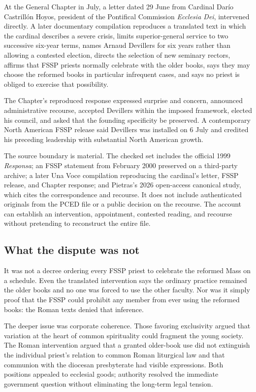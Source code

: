 At the General Chapter in July, a letter dated 29 June from Cardinal Darío Castrillón Hoyos, president of the Pontifical Commission \emph{Ecclesia Dei}, intervened directly. A later documentary compilation reproduces a translated text in which the cardinal describes a severe crisis, limits superior-general service to two successive six-year terms, names Arnaud Devillers for six years rather than allowing a contested election, directs the selection of new seminary rectors, affirms that FSSP priests normally celebrate with the older books, says they may choose the reformed books in particular infrequent cases, and says no priest is obliged to exercise that possibility.

The Chapter's reproduced response expressed surprise and concern, announced administrative recourse, accepted Devillers within the imposed framework, elected his council, and asked that the founding specificity be preserved. A contemporary North American FSSP release said Devillers was installed on 6 July and credited his preceding leadership with substantial North American growth.

The source boundary is material. The checked set includes the official 1999 \emph{Responsa}; an FSSP statement from February 2000 preserved on a third-party archive; a later Una Voce compilation reproducing the cardinal's letter, FSSP release, and Chapter response; and Pietras's 2026 open-access canonical study, which cites the correspondence and recourse. It does not include authenticated originals from the PCED file or a public decision on the recourse. The account can establish an intervention, appointment, contested reading, and recourse without pretending to reconstruct the entire file.

\subsection{What the dispute was not}

It was not a decree ordering every FSSP priest to celebrate the reformed Mass on a schedule. Even the translated intervention says the ordinary practice remained the older books and no one was forced to use the other faculty. Nor was it simply proof that the FSSP could prohibit any member from ever using the reformed books: the Roman texts denied that inference.

The deeper issue was corporate coherence. Those favoring exclusivity argued that variation at the heart of common spirituality could fragment the young society. The Roman intervention argued that a granted older-book use did not extinguish the individual priest's relation to common Roman liturgical law and that communion with the diocesan presbyterate had visible expressions. Both positions appealed to ecclesial goods; authority resolved the immediate government question without eliminating the long-term legal tension.

